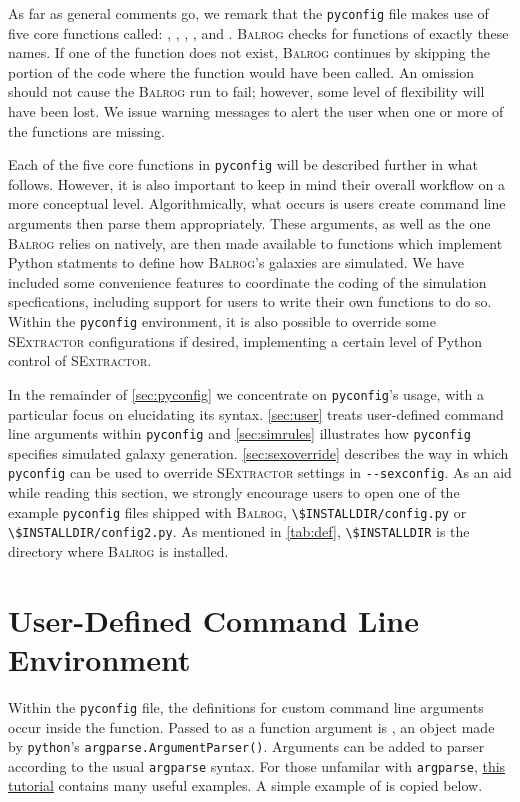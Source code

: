 \documentclass[12pt]{book}
\newcommand{\codett}[1]{\lstinline{#1}}
\newcommand{\py}{Python}
\newcommand{\pyconfig}{\codett{pyconfig}}
\newcommand{\balrog}{\textsc{Balrog}}
\newcommand{\sex}{\textsc{SExtractor}}
\newcommand{\opt}[1]{\codett{--#1}}
\begin{document}
As far as general comments go, we remark that the \pyconfig{} file makes use of five core functions called:
\argsfunc, \parsefunc, \simfunc,  \gspfunc, and \sexfunc.
\balrog{} checks for functions of exactly these names.
If one of the function does not exist,
\balrog{} continues by skipping the portion of the code where the function would have been called.
An omission should not cause the \balrog{} run to fail; however, some level of flexibility will have been lost.
We issue warning messages to alert the user when one or more of the functions are missing.

Each of the five core functions in \pyconfig{} will be described further in what follows.
However, it is also important to keep in mind their overall workflow on a more conceptual level.
Algorithmically, what occurs is users create command line arguments then parse them appropriately.
These arguments, as well as the one \balrog{} relies on natively, are then made available to 
functions which implement \py{} statments to define how \balrog{}'s galaxies are simulated.
We have included some convenience features to coordinate the coding of the simulation specfications,
including support for users to write their own functions to do so.
Within the \pyconfig{} environment, it is also possible to override some \sex{} configurations if desired,
implementing a certain level of \py{} control of \sex{}.

In the remainder of \autoref{sec:pyconfig} we concentrate on \pyconfig{}'s usage, with a particular focus on elucidating its syntax.
\autoref{sec:user} treats user-defined command line arguments within \pyconfig{} and 
\autoref{sec:simrules} illustrates how \pyconfig{} specifies simulated galaxy generation.
\autoref{sec:sexoverride} describes the way in which \pyconfig{} can be used to override \sex{} settings in \opt{sexconfig}.
As an aid while reading this section, 
we strongly encourage users to open one of the example \pyconfig{} files shipped with \balrog{},
\codett{\$INSTALLDIR/config.py} or \codett{\$INSTALLDIR/config2.py}.
As mentioned in \autoref{tab:def}, \codett{\$INSTALLDIR} is the directory where \balrog{} is installed.

\section{User-Defined Command Line Environment}
\label{sec:user}

Within the \pyconfig{} file, the definitions for custom command line arguments occur inside the \argsfunc{} function.
Passed to \argsfunc{}  as a function argument is \argsparser{},
an object made by \codett{python}'s
\codett{argparse.ArgumentParser()}. Arguments
can be added to parser according to the usual
\codett{argparse} syntax.
For those unfamilar with \codett{argparse},
\href{http://docs.python.org/2/howto/argparse.html}{this tutorial}
contains many useful examples. A simple example of
\argsfunc{} is copied below.
\end{document}
